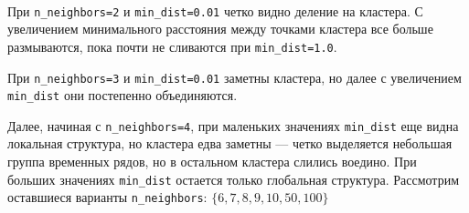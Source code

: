 \begin{tabular}{c|c|c|c|c}
\end{tabular}\\[2mm]

При \verb|n_neighbors=2| и \verb|min_dist=0.01| четко видно деление на кластера. С увеличением минимального расстояния между точками кластера все больше размываются, пока почти не сливаются при \verb|min_dist=1.0|.

При \verb|n_neighbors=3| и \verb|min_dist=0.01| заметны кластера, но далее с увеличением \verb|min_dist| они постепенно объединяются.

Далее, начиная с \verb|n_neighbors=4|, при маленьких значениях \verb|min_dist| еще видна локальная структура, но кластера едва заметны --- четко выделяется небольшая группа временных рядов, но в остальном кластера слились воедино. При больших значениях \verb|min_dist| остается только глобальная структура.
\newpage
Рассмотрим оставшиеся варианты \verb|n_neighbors|: $\{6, 7, 8, 9, 10, 50, 100\}$

